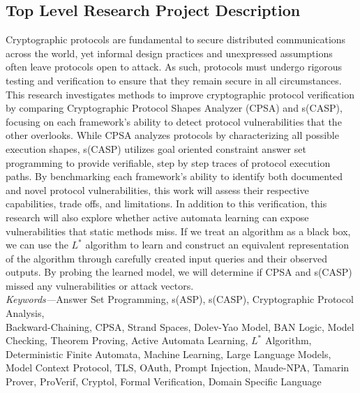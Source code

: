 \documentclass[11pt]{article}
\begin{document}
\subsection{Top Level Research Project Description}
Cryptographic protocols are fundamental to secure distributed communications across the world, yet informal design practices and unexpressed assumptions often leave protocols open to attack. As such, protocols must undergo rigorous testing and verification to ensure that they remain secure in all circumstances. This research investigates methods to improve cryptographic protocol verification by comparing Cryptographic Protocol Shapes Analyzer (CPSA) and s(CASP), focusing on each framework's ability to detect protocol vulnerabilities that the other overlooks. While CPSA analyzes protocols by characterizing all possible execution shapes, s(CASP) utilizes goal oriented constraint answer set programming to provide verifiable, step by step traces of protocol execution paths. By benchmarking each framework's ability to identify both documented and novel protocol vulnerabilities, this work will assess their respective capabilities, trade offs, and limitations. In addition to this verification, this research will also explore whether active automata learning can expose vulnerabilities that static methods miss. If we treat an algorithm as a black box, we can use the $L^*$ algorithm to learn and construct an equivalent representation of the algorithm through carefully created input queries and their observed outputs. By probing the learned model, we will determine if CPSA and s(CASP) missed any vulnerabilities or attack vectors.\\

\noindent
\textit{Keywords—}Answer Set Programming, s(ASP), s(CASP), Cryptographic Protocol Analysis,\\Backward-Chaining, CPSA, Strand Spaces, Dolev-Yao Model, BAN Logic, Model Checking, Theorem Proving, Active Automata Learning, $L^*$ Algorithm, Deterministic Finite Automata, Machine Learning, Large Language Models, Model Context Protocol, TLS, OAuth, Prompt Injection, Maude-NPA, Tamarin Prover, ProVerif, Cryptol, Formal Verification, Domain Specific Language
\end{document}
